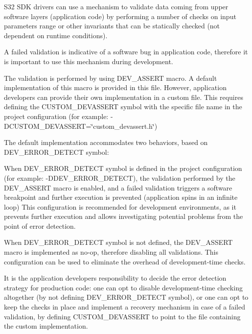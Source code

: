 S32 SDK drivers can use a mechanism to validate data coming from upper software layers (application code) by performing a number of checks on input parameters\textquotesingle{} range or other invariants that can be statically checked (not dependent on runtime conditions).

A failed validation is indicative of a software bug in application code, therefore it is important to use this mechanism during development.

The validation is performed by using DEV\+\_\+\+ASSERT macro. A default implementation of this macro is provided in this file. However, application developers can provide their own implementation in a custom file. This requires defining the CUSTOM\+\_\+\+DEVASSERT symbol with the specific file name in the project configuration (for example\+: -\/DCUSTOM\+\_\+\+DEVASSERT=\char`\"{}custom\+\_\+devassert.\+h\char`\"{})

The default implementation accommodates two behaviors, based on DEV\+\_\+\+ERROR\+\_\+\+DETECT symbol\+:
\begin{DoxyItemize}
\item When DEV\+\_\+\+ERROR\+\_\+\+DETECT symbol is defined in the project configuration (for example\+: -\/DDEV\+\_\+\+ERROR\+\_\+\+DETECT), the validation performed by the DEV\+\_\+\+ASSERT macro is enabled, and a failed validation triggers a software breakpoint and further execution is prevented (application spins in an infinite loop) This configuration is recommended for development environments, as it prevents further execution and allows investigating potential problems from the point of error detection.
\item When DEV\+\_\+\+ERROR\+\_\+\+DETECT symbol is not defined, the DEV\+\_\+\+ASSERT macro is implemented as no-\/op, therefore disabling all validations. This configuration can be used to eliminate the overhead of development-\/time checks.
\end{DoxyItemize}

It is the application developer\textquotesingle{}s responsibility to decide the error detection strategy for production code\+: one can opt to disable development-\/time checking altogether (by not defining DEV\+\_\+\+ERROR\+\_\+\+DETECT symbol), or one can opt to keep the checks in place and implement a recovery mechanism in case of a failed validation, by defining CUSTOM\+\_\+\+DEVASSERT to point to the file containing the custom implementation. 